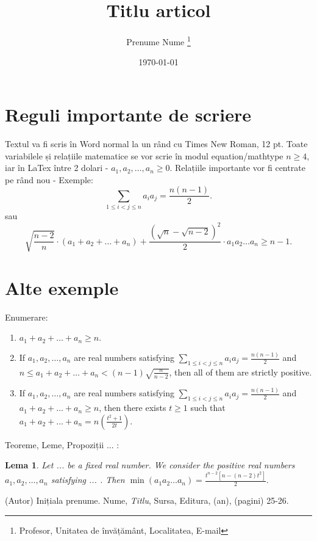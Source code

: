 \documentclass[journal,noindent,headline,twoside,indent,a4paper,12pt]{paper_RDMI}
\newcounter{p}%
\newtheorem{lema}{Lema}
\theoremstyle{remark}
\begin{document}
\title{Titlu articol}
\author{Prenume Nume
\thanks{Profesor, Unitatea de învățământ, Localitatea, E-mail}}
\institution{}
\date{\today}
\maketitle

\section{Reguli importante de scriere}
Textul va fi scris în Word normal la un rând cu Times New Roman, 12 pt.
Toate variabilele și relațiile matematice se vor scrie în modul equation/mathtype $n\ge 4$, iar în LaTex între 2 dolari - $a_{1} ,a_{2} ,\ldots ,a_{n} \ge 0$.
Relațiile importante vor fi centrate pe rând nou - Exemple:
$$\mathop{\sum }\limits_{1\le i<j\le n} a_{i} a_{j} =\frac{n\left(n-1\right)}{2}.$$
sau
\[\sqrt{\frac{n-2}{n} } \cdot \left(a_{1} +a_{2} +\ldots +a_{n} \right)+\frac{\left(\sqrt{n} -\sqrt{n-2} \right)^{2} }{2} \cdot a_{1} a_{2} \ldots a_{n} \ge n-1.\]
\section{Alte  exemple}
Enumerare:
\begin{enumerate}
\item $a_{1} +a_{2} +\ldots +a_{n} \ge n.$
\item If $a_{1} ,a_{2} ,\ldots ,a_{n}$  are real numbers satisfying $\mathop{\sum }\limits_{1\le i<j\le n} a_{i} a_{j} =\frac{n\left(n-1\right)}{2}$  and
$n\le a_{1} +a_{2} +\ldots +a_{n} <\left(n-1\right)\sqrt{\frac{n}{n-2} }$, then all of them are strictly positive.
\item If $a_{1} ,a_{2} ,\ldots ,a_{n}$  are real numbers satisfying $\mathop{\sum }\limits_{1\le i<j\le n} a_{i} a_{j} =\frac{n\left(n-1\right)}{2}$  and
$a_{1} +a_{2} +\ldots +a_{n} \ge n$, then there exists $t\ge 1$ such that $a_{1} +a_{2} +\ldots +a_{n} =n\left(\frac{t^{2} +1}{2t} \right)$.
\end{enumerate}
Teoreme, Leme, Propoziții ... :
\begin{lema}
Let ... be a fixed real number. We consider the positive real numbers $a_{1} ,a_{2} ,\ldots ,a_{n} $
satisfying ... .
Then $\min \left(a_{1} a_{2} \ldots a_{n} \right)=\frac{t^{n-2} \left[n-\left(n-2\right)t^{2} \right]}{2}.$
\end{lema}

\begin{thebibliography}{9}
 (Autor) Inițiala prenume. Nume, \textit{Titlu}, Sursa, Editura, (an), (pagini) 25-26.
\end{thebibliography}
\end{document}
